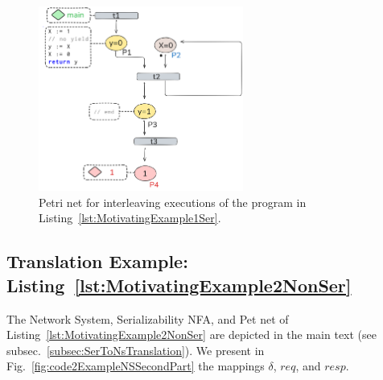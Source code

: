 \begin{figure}[H]
	\centering
	\includegraphics[width=0.6\textwidth]{plots/code_1_PN_with_annotation.png}
	\caption{Petri net for interleaving executions of the program in Listing~\ref{lst:MotivatingExample1Ser}.}
	\label{fig:code1ExamplePN}
\end{figure}


%

\subsection{Translation Example: Listing~\ref{lst:MotivatingExample2NonSer}}
\label{appendix:subsec::Ex1B:NS}

The Network System, Serializability NFA, and Pet net of Listing~\ref{lst:MotivatingExample2NonSer} are depicted in the main text (see subsec.~\ref{subsec:SerToNsTranslation}).
%
We present in Fig.~\ref{fig:code2ExampleNSSecondPart} the mappings \(\delta\), $req$, and $resp$.

